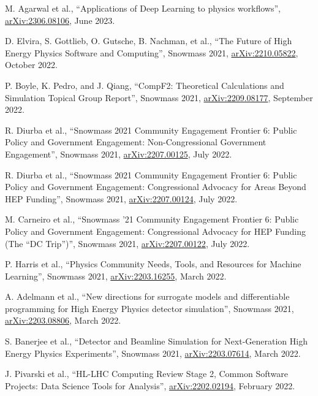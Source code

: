 \begin{description}[leftmargin=12pt,font=\normalfont,labelsep=0em]
\item M. Agarwal et al., ``Applications of Deep Learning to physics workflows'', \href{https://arxiv.org/abs/2306.08106}{arXiv:2306.08106}, June 2023. %
\item D. Elvira, S. Gottlieb, O. Gutsche, B. Nachman, et al., ``The Future of High Energy Physics Software and Computing'', Snowmass 2021, \href{https://arxiv.org/abs/2210.05822}{arXiv:2210.05822}, October 2022. %
\item P. Boyle, K. Pedro, and J. Qiang, ``CompF2: Theoretical Calculations and Simulation Topical Group Report'', Snowmass 2021, \href{https://arxiv.org/abs/2209.08177}{arXiv:2209.08177}, September 2022. %
\item R. Diurba et al., ``Snowmass 2021 Community Engagement Frontier 6: Public Policy and Government Engagement: Non-Congressional Government Engagement'', Snowmass 2021, \href{https://arxiv.org/abs/2207.00125}{arXiv:2207.00125}, July 2022. %
\item R. Diurba et al., ``Snowmass 2021 Community Engagement Frontier 6: Public Policy and Government Engagement: Congressional Advocacy for Areas Beyond HEP Funding'', Snowmass 2021, \href{https://arxiv.org/abs/2207.00124}{arXiv:2207.00124}, July 2022. %
\item M. Carneiro et al., ``Snowmass '21 Community Engagement Frontier 6: Public Policy and Government Engagement: Congressional Advocacy for HEP Funding (The ``DC Trip'')'', Snowmass 2021, \href{https://arxiv.org/abs/2207.00122}{arXiv:2207.00122}, July 2022. %
\item P. Harris et al., ``Physics Community Needs, Tools, and Resources for Machine Learning'', Snowmass 2021, \href{https://arxiv.org/abs/2203.16255}{arXiv:2203.16255}, March 2022. %
\item A. Adelmann et al., ``New directions for surrogate models and differentiable programming for High Energy Physics detector simulation'', Snowmass 2021, \href{https://arxiv.org/abs/2203.08806}{arXiv:2203.08806}, March 2022. %
\item S. Banerjee et al., ``Detector and Beamline Simulation for Next-Generation High Energy Physics Experiments'', Snowmass 2021, \href{https://arxiv.org/abs/2203.07614}{arXiv:2203.07614}, March 2022. %
\item J. Pivarski et al., ``HL-LHC Computing Review Stage 2, Common Software Projects: Data Science Tools for Analysis'', \href{https://arxiv.org/abs/2202.02194}{arXiv:2202.02194}, February 2022. %

\end{description}
